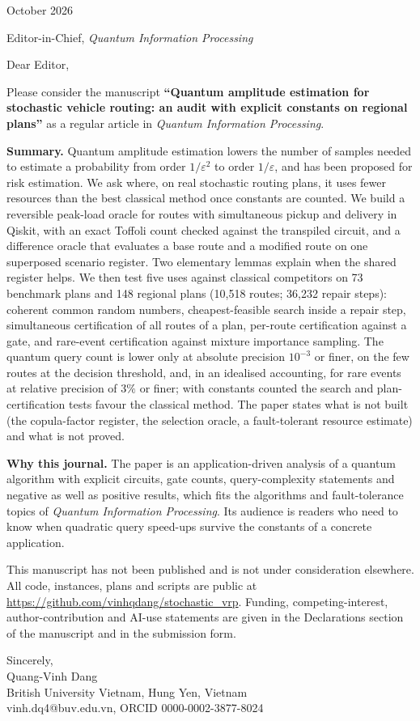 \documentclass[10.5pt]{article}
\begin{document}
October 2026

Editor-in-Chief, \emph{Quantum Information Processing}

Dear Editor,

Please consider the manuscript \textbf{``Quantum amplitude estimation for stochastic vehicle routing: an audit with explicit constants on regional plans''} as a regular article in \emph{Quantum Information Processing}.

\textbf{Summary.} Quantum amplitude estimation lowers the number of samples needed to estimate a probability from order $1/\varepsilon^2$ to order $1/\varepsilon$, and has been proposed for risk estimation. We ask where, on real stochastic routing plans, it uses fewer resources than the best classical method once constants are counted. We build a reversible peak-load oracle for routes with simultaneous pickup and delivery in Qiskit, with an exact Toffoli count checked against the transpiled circuit, and a difference oracle that evaluates a base route and a modified route on one superposed scenario register. Two elementary lemmas explain when the shared register helps. We then test five uses against classical competitors on 73 benchmark plans and 148 regional plans (10,518 routes; 36,232 repair steps): coherent common random numbers, cheapest-feasible search inside a repair step, simultaneous certification of all routes of a plan, per-route certification against a gate, and rare-event certification against mixture importance sampling. The quantum query count is lower only at absolute precision $10^{-3}$ or finer, on the few routes at the decision threshold, and, in an idealised accounting, for rare events at relative precision of $3\%$ or finer; with constants counted the search and plan-certification tests favour the classical method. The paper states what is not built (the copula-factor register, the selection oracle, a fault-tolerant resource estimate) and what is not proved.

\textbf{Why this journal.} The paper is an application-driven analysis of a quantum algorithm with explicit circuits, gate counts, query-complexity statements and negative as well as positive results, which fits the algorithms and fault-tolerance topics of \emph{Quantum Information Processing}. Its audience is readers who need to know when quadratic query speed-ups survive the constants of a concrete application.

This manuscript has not been published and is not under consideration elsewhere. All code, instances, plans and scripts are public at \url{https://github.com/vinhqdang/stochastic_vrp}. Funding, competing-interest, author-contribution and AI-use statements are given in the Declarations section of the manuscript and in the submission form.

Sincerely,\\[0.3em]
Quang-Vinh Dang\\
British University Vietnam, Hung Yen, Vietnam\\
vinh.dq4@buv.edu.vn, ORCID 0000-0002-3877-8024
\end{document}

